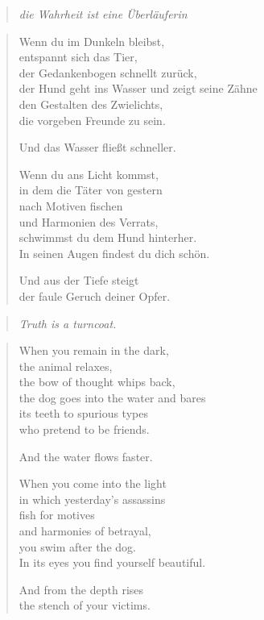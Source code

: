 
\cleartoverso


\begin{quote}
\itshape\smaller
die Wahrheit ist eine Überläuferin

\end{quote}

\begin{verse}

Wenn du im Dunkeln bleibst,\\
entspannt sich das Tier,\\
der Gedankenbogen schnellt zurück,\\
der Hund geht ins Wasser und zeigt seine Zähne\\
den Gestalten des Zwielichts,\\
die vorgeben Freunde zu sein.

Und das Wasser fließt schneller.

Wenn du ans Licht kommst,\\
in dem die Täter von gestern\\
nach Motiven fischen\\
und Harmonien des Verrats,\\
schwimmst du dem Hund hinterher.\\
In seinen Augen findest du dich schön.

Und aus der Tiefe steigt\\
der faule Geruch deiner Opfer.

\end{verse}

\clearpage

\label{gladio}

\begin{quote}
\itshape\smaller
Truth is a turncoat.

\end{quote}

\begin{verse}

When you remain in the dark,\\
the animal relaxes,\\
the bow of thought whips back,\\
the dog goes into the water and bares\\
its teeth to spurious types\\
who pretend to be friends.

And the water flows faster.

When you come into the light\\
in which yesterday's assassins\\
fish for motives\\
and harmonies of betrayal,\\
you swim after the dog.\\
In its eyes you find yourself beautiful.

And from the depth rises\\
the stench of your victims.

\end{verse}
